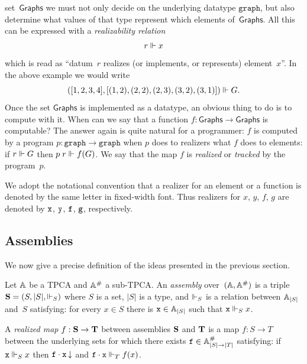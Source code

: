 set~$\mathsf{Graphs}$ we must not only decide on the underlying
datatype $\mathtt{graph}$, but also determine what values of that type
represent which elements of~$\mathsf{Graphs}$. All this can be
expressed with a \emph{realizability relation}
%
\begin{equation*}
  r \rz x
\end{equation*}
%
which is read as ``datum~$r$ realizes (or implements, or represents)
element~$x$''. In the above example we would write
%
\begin{equation*}
([1, 2, 3, 4], [(1,2), (2,2), (2,3), (3,2), (3,1)]) \rz G.
\end{equation*}
%
Once the set $\mathsf{Graphs}$ is implemented as a datatype, an
obvious thing to do is to compute with it. When can we say that a
function $f : \mathsf{Graphs} \to \mathsf{Graphs}$ is computable? The
answer again is quite natural for a programmer: $f$ is computed by a
program $p : \mathtt{graph} \to \mathtt{graph}$ when $p$ does to
realizers what $f$ does to elements: if $r \rz G$ then $p \; r \rz
f(G)$. We say that the map $f$ is \emph{realized} or \emph{tracked} by
the program~$p$.

We adopt the notational convention that a realizer for an element or a
function is denoted by the same letter in fixed-width font. Thus
realizers for $x$, $y$, $f$, $g$ are denoted by $\R{x}$, $\R{y}$,
$\R{f}$, $\R{g}$, respectively.

\subsection{Assemblies}
\label{sec:assemblies}

We now give a precise definition of the ideas presented in the
previous section.

\begin{definition}[Assemblies]
  Let $\AA$ be a TPCA and $\compAA$ a sub-TPCA. An \emph{assembly}
  over~$(\AA, \compAA)$ is a triple $\asm{S} = \xasm{S}$ where $S$ is
  a set, $|S|$ is a type, and $\rz_S$ is a relation between
  $\xAtyp{S}$ and~$S$ satisfying: for every $x \in S$ there is $\R{x}
  \in \xAtyp{S}$ such that $\R{x} \rz_S x$.

  A \emph{realized map} $f : \asm{S} \to \asm{T}$ between assemblies
  $\asm{S}$ and $\asm{T}$ is a map $f : S \to T$ between the
  underlying sets for which there exists $\R{f} \in \compAtyp{|S| \to
    |T|}$ satisfying: if $\R{x} \rz_S x$ then $\defined{\R{f} \cdot
    \R{x}}$ and $\R{f} \cdot \R{x} \rz_T f(x)$.
\end{definition}

